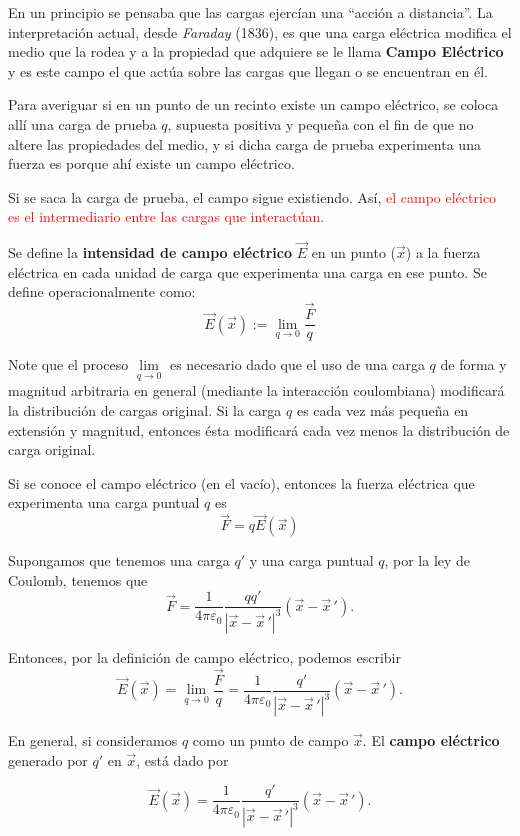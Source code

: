 En un principio se pensaba que las cargas ejercían una “acción a distancia”. La interpretación actual, desde \textit{Faraday }(1836), es que una carga eléctrica modifica el medio que la rodea y a la propiedad que adquiere se le llama \textbf{Campo Eléctrico} y es este campo el que actúa sobre las cargas que llegan o se encuentran en él.

Para averiguar si en un punto de un recinto existe un campo eléctrico, se coloca allí una carga de prueba $q$, supuesta positiva y pequeña con el fin de que no altere las propiedades del medio, y si dicha carga de prueba experimenta una fuerza es porque ahí existe un campo eléctrico.

Si se saca la carga de prueba, el campo sigue existiendo. Así, \textcolor{red}{el campo eléctrico es el intermediario entre las cargas que interactúan.}

Se define la \textbf{intensidad de campo eléctrico} $\vec{E}$ en un punto ($\vec{x}$) a la fuerza eléctrica en cada unidad de carga que experimenta una carga en ese punto. Se define operacionalmente como:
$$\boxed{\vec{E}(\vec{x}) := \lim_{q \to 0} \frac{\vec{F}}{q}}$$

Note que el proceso $\lim\limits_{q \to 0}$ es necesario dado que el uso de una carga $q$ de forma y magnitud arbitraria en general (mediante la interacción coulombiana) modificará la distribución de cargas original. Si la carga $q$ es cada vez más pequeña en extensión y magnitud, entonces ésta modificará cada vez menos la distribución de carga original.

Si se conoce el campo eléctrico (en el vacío), entonces la fuerza eléctrica que experimenta una carga puntual $q$ es
$$\boxed{\vec{F} = q \vec{E}(\vec{x})}$$

Supongamos que tenemos una carga $q'$ y una carga puntual $q$, por la ley de Coulomb, tenemos que
$$\vec{F} = \frac{1}{4\pi \varepsilon_0} \frac{q q'}{|\vec{x} - \vec{x}\,'|^3} (\vec{x} - \vec{x}\,').$$

Entonces, por la definición de campo eléctrico, podemos escribir
\begin{equation*}
\vec{E}(\vec{x}) = \lim_{q \to 0} \frac{\vec{F}}{q} = \frac{1}{4\pi \varepsilon_0} \frac{ q'}{|\vec{x} - \vec{x}\,'|^3} (\vec{x} - \vec{x}\,').
\end{equation*}

En general, si consideramos $q$ como un punto de campo $\vec{x}$. El \textbf{campo eléctrico} generado por $q'$ en $\vec{x}$, está dado por
\begin{shaded}
$$\vec{E}(\vec{x}) = \frac{1}{4 \pi \varepsilon_0} \frac{ q'}{|\vec{x} - \vec{x}\,'|^3} (\vec{x} - \vec{x}\,').$$
\end{shaded}

